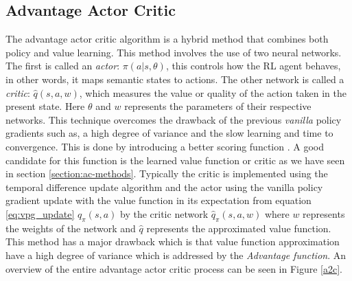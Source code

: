 \documentclass[12pt]{extarticle}
\numberwithin{equation}{section}
\begin{document}
	\subsection{Advantage Actor Critic}	\label{a2c-section}
	The advantage actor critic algorithm is a hybrid method that combines both policy and value learning. This method involves the use of two neural networks. The first is called an \textit{actor}: $\pi(a|s,\theta)$, this controls how the RL agent behaves, in other words, it maps semantic states to actions. The other network is called a \textit{critic}: $\hat{q}(s,a,w)$, which measures the value or quality of the action taken in the present state. Here $\theta$ and $w$ represents the parameters of their respective networks. This technique overcomes the drawback of the previous \textit{vanilla} policy gradients such as, a high degree of variance and the slow learning and time to convergence. This is done by introducing a better scoring function \cite{Sutton_pg}. A good candidate for this function is the learned value function or critic as we have seen in section \ref{section:ac-methods}. Typically the critic is implemented using the temporal difference update algorithm and the actor using the vanilla policy gradient update with the value function in its expectation from equation \ref{eq:vpg_update} $q_{\pi}(s,a)$ by the critic network $\hat{q}_{\pi}(s,a,w)$ where $w$ represents the weights of the network and $\hat{q}$ represents the approximated value function. This method has a major drawback which is that value function approximation have a high degree of variance which is addressed by the \textit{Advantage function}. An overview of the entire advantage actor critic process can be seen in Figure \ref{a2c}.
\end{document}
